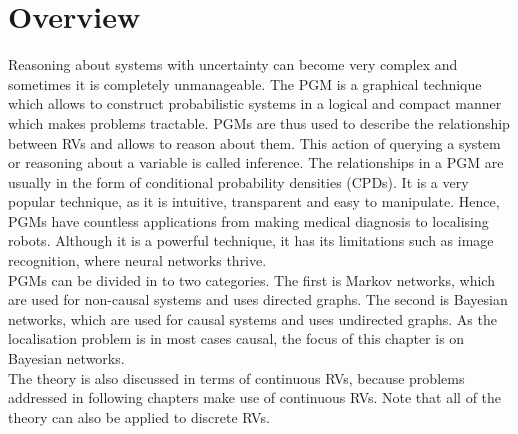 \documentclass[12pt,oneside,openany,a4paper, %
afrikaans,english,
]{memoir}
\numberwithin{equation}{chapter}
\begin{document}
\section{Overview}
Reasoning about systems with uncertainty can become very complex and sometimes it is completely unmanageable. The PGM is a graphical technique which allows to construct probabilistic systems in a logical and compact manner which makes problems tractable. PGMs are thus used to describe the relationship between RVs and allows to reason about them. This action of querying a system or reasoning about a variable is called inference. The relationships in a PGM are usually in the form of conditional probability densities (CPDs). It is a very popular technique, as it is intuitive, transparent and easy to manipulate. Hence, PGMs have countless applications from making medical diagnosis to localising robots. Although it is a powerful technique, it has its limitations such as image recognition, where neural networks thrive.\\
PGMs can be divided in to two categories. The first is Markov networks, which are used for non-causal systems and uses directed graphs. The second is Bayesian networks, which are used for causal systems and uses undirected graphs. As the localisation problem is in most cases causal, the focus of this chapter is on Bayesian networks.\\
The theory is also discussed in terms of continuous RVs, because problems addressed in following chapters make use of continuous RVs. Note that all of the theory can also be applied to discrete RVs. 
\end{document}
